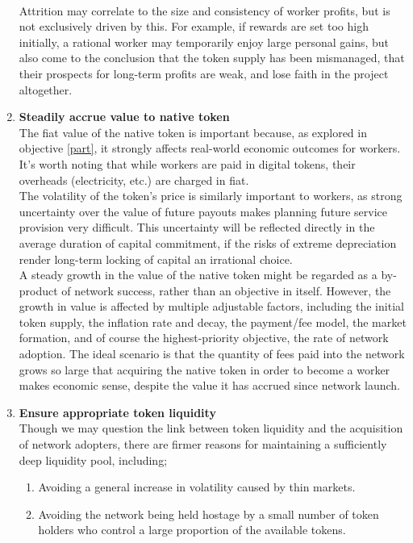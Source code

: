 \documentclass[11pt]{amsart}
\begin{document}
\begin{enumerate}
   \\
   Attrition may correlate to the size and consistency of worker profits, but is not exclusively driven by this. For example, if rewards are set too high initially, a rational worker may temporarily enjoy large personal gains, but also come to the conclusion that the token supply has been mismanaged, that their prospects for long-term profits are weak, and lose faith in the project altogether. 
   \\
   \item \textbf{Steadily accrue value to native token} \label{value}
   \\
   The fiat value of the native token is important because, as explored in objective \ref{part}, it strongly affects real-world economic outcomes for workers. It's worth noting that while workers are paid in digital tokens, their overheads (electricity, etc.) are charged in fiat. 
   \\
   The volatility of the token's price is similarly important to workers, as strong uncertainty over the value of future payouts makes planning future service provision very difficult. This uncertainty will be reflected directly in the average duration of capital commitment, if the risks of extreme depreciation render long-term locking of capital an irrational choice. 
   \\
   A steady growth in the value of the native token might be regarded as a by-product of network success, rather than an objective in itself. However, the growth in value is affected by multiple adjustable factors, including the initial token supply, the inflation rate and decay, the payment/fee model, the market formation, and of course the highest-priority objective, the rate of network adoption. The ideal scenario is that the quantity of fees paid into the network grows so large that acquiring the native token in order to become a worker makes economic sense, despite the value it has accrued since network launch.  
   \\
   \item \textbf{Ensure appropriate token liquidity}\label{liquid}
   \\
   Though we may question the link between token liquidity and the acquisition of network adopters, there are firmer reasons for maintaining a sufficiently deep liquidity pool, including;
   \begin{enumerate}
   \item Avoiding a general increase in volatility caused by thin markets.
   \item Avoiding the network being held hostage by a small number of token holders who control a large proportion of the available tokens. 

\end{enumerate}
\end{enumerate}
\end{document}
